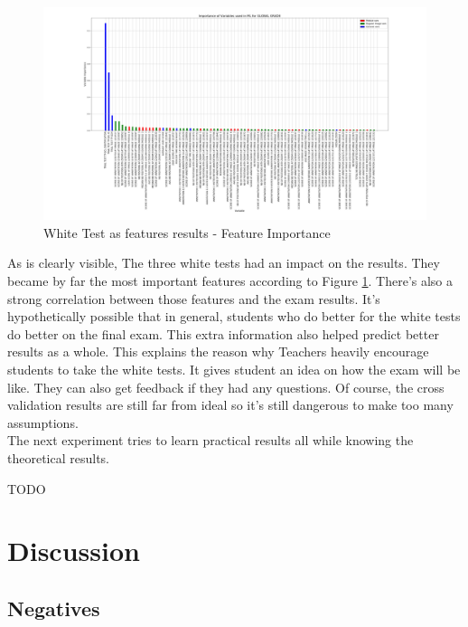 \documentclass[a4paper,11pt]{report}
\numberwithin{figure}{section} %
\begin{document}
      \begin{figure}[H]
      \centering
      \includegraphics[width=.95\linewidth]{plots/test1_var_importance_GLOBAL_GRADE_2018-05-17_10_12_18.png}
      \caption{White Test as features results - Feature Importance}
      \label{fig:test1_2}
      \end{figure}
    As is clearly visible, The three white tests had an impact on the results.
    They became by far the most important features according to Figure \ref{fig:test1_2}.
    There's also a strong correlation between those features and the exam results.
    It's hypothetically possible that in general, students who do better for the white tests do better on the final exam.
    This extra information also helped predict better results as a whole.
    This explains the reason why Teachers heavily encourage students to take the white tests.
    It gives student an idea on how the exam will be like.
    They can also get feedback if they had any questions.
    Of course, the cross validation results are still far from ideal so it's still dangerous to make too many assumptions.\\

    The next experiment tries to learn practical results all while knowing the theoretical results.

    {\color{red} TODO}
    
    
    
\section{Discussion} \label{Discussion}

    \subsection{Negatives}
\end{document}
